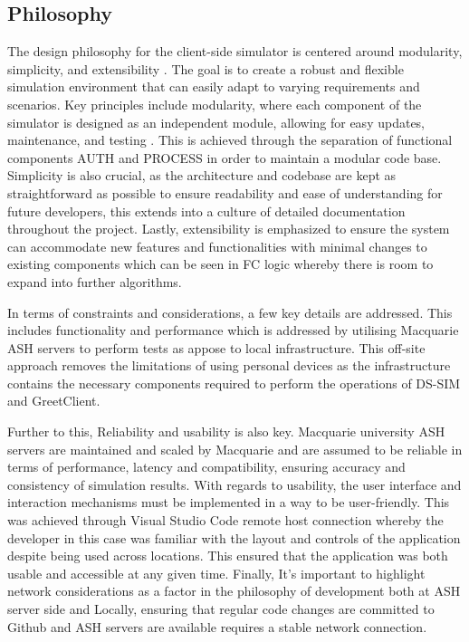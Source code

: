 
\subsection{Philosophy}
The design philosophy for the client-side simulator is centered around modularity, simplicity, and extensibility \cite{6654207}. The goal is to create a robust and flexible simulation environment that can easily adapt to varying requirements and scenarios. Key principles include modularity, where each component of the simulator is designed as an independent module, allowing for easy updates, maintenance, and testing \cite{7463700}. This is achieved through the separation of functional components AUTH and PROCESS in order to maintain a modular code base. Simplicity is also crucial, as the architecture and codebase are kept as straightforward as possible to ensure readability and ease of understanding for future developers, this extends into a culture of detailed documentation throughout the project. \cite{9711975} Lastly, extensibility is emphasized to ensure the system can accommodate new features and functionalities with minimal changes to existing components which can be seen in FC logic whereby there is room to expand into further algorithms.

In terms of constraints and considerations, a few key details are addressed. This includes functionality and performance which is addressed by utilising Macquarie ASH servers to perform tests as appose to local infrastructure. This off-site approach removes the limitations of using personal devices as the infrastructure contains the necessary components required to perform the operations of DS-SIM and GreetClient.

Further to this, Reliability and usability is also key. Macquarie university ASH servers are maintained and scaled by Macquarie and are assumed to be reliable in terms of performance, latency and compatibility, ensuring accuracy and consistency of simulation results. With regards to usability, the user interface and interaction mechanisms must be implemented in a way to be user-friendly. This was achieved through Visual Studio Code remote host connection whereby the developer in this case was familiar with the layout and controls of the application despite being used across locations. This ensured that the application was both usable and accessible at any given time. Finally, It's important to highlight network considerations as a factor in the philosophy of development both at ASH server side and Locally, ensuring that regular code changes are committed to Github and ASH servers are available requires a stable network connection.


